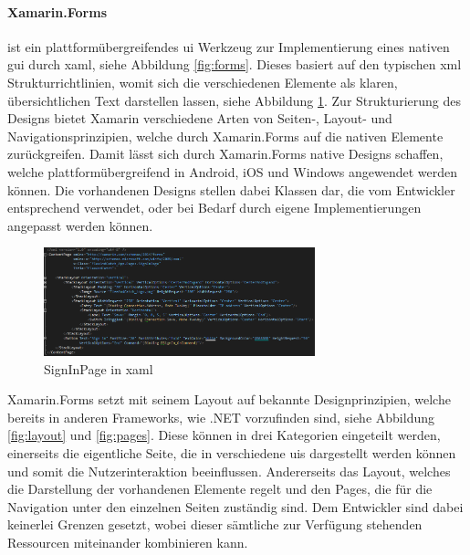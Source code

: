 \paragraph{Xamarin.Forms} ist ein plattformübergreifendes \gls{ui} Werkzeug zur Implementierung eines nativen \gls{gui} durch \gls{xaml}, siehe Abbildung \ref{fig:forms}. Dieses basiert auf den typischen \gls{xml} Strukturrichtlinien, womit sich die verschiedenen Elemente als klaren, übersichtlichen Text darstellen lassen, siehe Abbildung \ref{fig:xaml}. Zur Strukturierung des Designs bietet Xamarin verschiedene Arten von Seiten-, Layout- und Navigationsprinzipien, welche durch Xamarin.Forms auf die nativen Elemente zurückgreifen. Damit lässt sich durch Xamarin.Forms native Designs schaffen, welche plattformübergreifend in Android, iOS und Windows angewendet werden können. Die vorhandenen Designs stellen dabei Klassen dar, die vom Entwickler entsprechend verwendet, oder bei Bedarf durch eigene Implementierungen angepasst werden können.\\

\begin{figure}[h]
	\begin{center}
		\includegraphics[width=0.7\textwidth]{images/technische_grundlagen/xaml.png}
	\end{center}	
	\caption{SignInPage in \acrshort{xaml}}
	\label{fig:xaml}
\end{figure}

\newpage
\noindent
Xamarin.Forms setzt mit seinem Layout auf bekannte Designprinzipien, welche bereits in anderen Frameworks, wie .NET vorzufinden sind, siehe Abbildung \ref{fig:layout} und \ref{fig:pages}. Diese können in drei Kategorien eingeteilt werden, einerseits die eigentliche Seite, die in verschiedene \glspl{ui} dargestellt werden können und somit die Nutzerinteraktion beeinflussen. Andererseits das Layout, welches die Darstellung der vorhandenen Elemente regelt und den Pages, die für die Navigation unter den einzelnen Seiten zuständig sind. Dem Entwickler sind dabei keinerlei Grenzen gesetzt, wobei dieser sämtliche zur Verfügung stehenden Ressourcen miteinander kombinieren kann.

